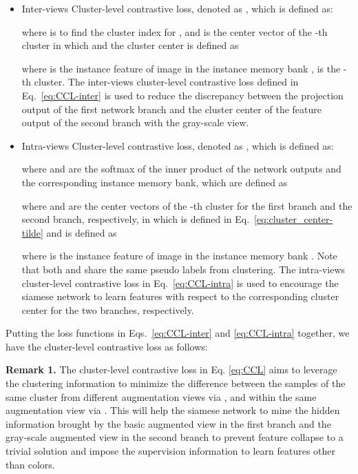 \documentclass[journal]{IEEEtran}
\newcommand{\myparagraph}[1]{\noindent\textbf{#1.}}
\begin{document}
\begin{itemize}\item Inter-views Cluster-level contrastive loss, denoted as , which is defined as: 

where  is to find the cluster index  for , and  is the center vector of the -th cluster in which  and the cluster center  is defined as

where  is the instance feature of image  in the instance memory bank , {   is the -th cluster.}
The inter-views cluster-level contrastive loss  defined in Eq.~\eqref{eq:CCL-inter} is used to reduce the discrepancy between the projection output  of the first network branch and the cluster center  of the feature output of the second branch with the gray-scale view.


\item Intra-views Cluster-level contrastive loss, 
denoted as , which is defined as:

where  and  are the softmax of the inner product of the network outputs and the corresponding instance memory bank, which are defined as

where 
 and  are the center vectors of the -th cluster for the first branch and the second branch, respectively, in which  is defined in Eq.~\eqref{eq:cluster_center-tilde} and  is defined as

where  is the instance feature of image  in the instance memory bank . Note that both  and  share the same pseudo labels  from clustering.
The intra-views cluster-level contrastive loss  in Eq.~\eqref{eq:CCL-intra} is used to encourage the siamese network to learn features with respect to the corresponding cluster center for the two branches, respectively. 


\end{itemize} 

 
Putting the loss functions in Eqs.~\eqref{eq:CCL-inter} and \eqref{eq:CCL-intra} together, we have the cluster-level contrastive loss  as follows:






\myparagraph{Remark 1} The cluster-level contrastive loss  in Eq. \eqref{eq:CCL} aims to leverage the clustering information to minimize the difference between the samples of the same cluster from different augmentation views via , and within the same augmentation view via . This will help the siamese network to  mine the hidden information brought by the basic augmented view in the first branch and the gray-scale augmented view in the second branch to prevent feature collapse to a trivial solution and impose the supervision information to learn features other than colors. 
\end{document}
